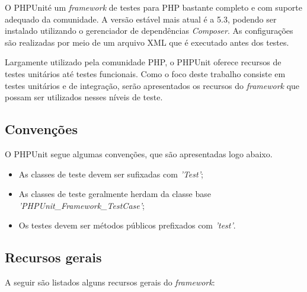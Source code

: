   O PHPUnit\footnotemark  é um \textit{framework} de testes para PHP bastante completo e com suporte adequado
  da comunidade. A versão estável mais atual é a 5.3, podendo ser instalado utilizando o gerenciador
  de dependências \textit{Composer}. As configurações são realizadas por meio de um arquivo XML que é 
  executado antes dos testes.
  
  Largamente utilizado pela comunidade PHP, o PHPUnit oferece recursos de testes unitários até
  testes funcionais. Como o foco deste trabalho consiste em testes unitários e de integração, serão
  apresentados os recursos do \textit{framework} que possam ser utilizados nesses níveis de teste.
  
  \subsection{Convenções}
    
    O PHPUnit segue algumas convenções, que são apresentadas logo abaixo.
    
    \begin{itemize}
      \item As classes de teste devem ser sufixadas com \textit{'Test'};
      
      \item As classes de teste geralmente herdam da classe base \textit{'PHPUnit\_Framework\_TestCase'};
      
      \item Os testes devem ser métodos públicos prefixados com \textit{'test'}.
    \end{itemize}

  
  \subsection{Recursos gerais}
  
    A seguir são listados alguns recursos gerais do \textit{framework}:
    
